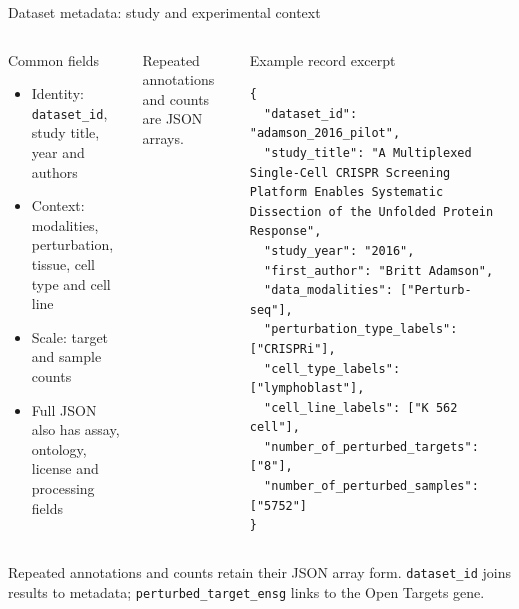 \documentclass[handout,aspectratio=169]{beamer}
\begin{document}
\begin{frame}[fragile]{Dataset metadata: study and experimental context}
  \begin{columns}[T,onlytextwidth]
      \begin{block}{Common fields}
        \footnotesize
        \begin{itemize}
          \item Identity: \texttt{dataset\_id}, study title, year and authors
          \item Context: modalities, perturbation, tissue, cell type and cell line
          \item Scale: target and sample counts
          \item Full JSON also has assay, ontology, license and processing fields
        \end{itemize}
      \end{block}
      \footnotesize Repeated annotations and counts are JSON arrays.
      \begin{block}{Example record excerpt}
        \tiny
        \begin{lstlisting}
{
  "dataset_id": "adamson_2016_pilot",
  "study_title": "A Multiplexed Single-Cell CRISPR Screening Platform Enables Systematic Dissection of the Unfolded Protein Response",
  "study_year": "2016",
  "first_author": "Britt Adamson",
  "data_modalities": ["Perturb-seq"],
  "perturbation_type_labels": ["CRISPRi"],
  "cell_type_labels": ["lymphoblast"],
  "cell_line_labels": ["K 562 cell"],
  "number_of_perturbed_targets": ["8"],
  "number_of_perturbed_samples": ["5752"]
}
        \end{lstlisting}
      \end{block}
  \end{columns}
  \vfill
  \footnotesize Repeated annotations and counts retain their JSON array form. \texttt{dataset\_id} joins results to metadata; \texttt{perturbed\_target\_ensg} links to the Open Targets gene.
\end{frame}
\end{document}
